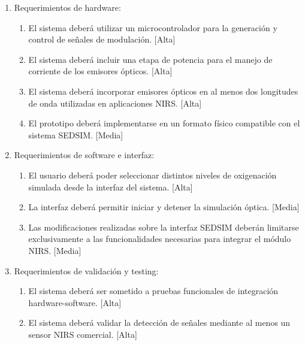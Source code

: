 \documentclass[
11pt, %
]{charter}
\begin{document}
\begin{enumerate}
\begin{enumerate}
	\end{enumerate}
	
	
	\item Requerimientos de hardware:
	\begin{enumerate}
	
		\item El sistema deberá utilizar un microcontrolador para la generación y control de señales de modulación. [Alta]
		
		\item El sistema deberá incluir una etapa de potencia para el manejo de corriente de los emisores ópticos. [Alta]
		
		\item El sistema deberá incorporar emisores ópticos en al menos dos longitudes de onda utilizadas en aplicaciones NIRS. [Alta]
		
		\item El prototipo deberá implementarse en un formato físico compatible con el sistema SEDSIM. [Media]
		
	\end{enumerate}
	
	
	\item Requerimientos de software e interfaz:
	\begin{enumerate}
	
		\item El usuario deberá poder seleccionar distintos niveles de oxigenación simulada desde la interfaz del sistema. [Alta]
		
		\item La interfaz deberá permitir iniciar y detener la simulación óptica. [Media]
		
		\item Las modificaciones realizadas sobre la interfaz SEDSIM deberán limitarse exclusivamente a las funcionalidades necesarias para integrar el módulo NIRS. [Media]
		
	\end{enumerate}
	
	
	\item Requerimientos de validación y testing:
	\begin{enumerate}
	
		\item El sistema deberá ser sometido a pruebas funcionales de integración hardware-software. [Alta]
		
		\item El sistema deberá validar la detección de señales mediante al menos un sensor NIRS comercial. [Alta]
		

\end{enumerate}
\end{enumerate}
\end{document}
